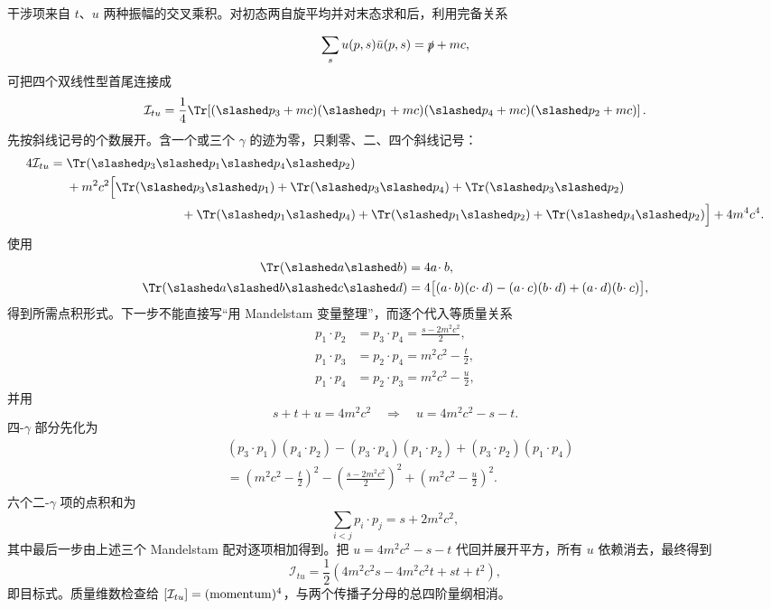 \begin{derivation}[相同费米子交换通道的干涉]
干涉项来自 $t$、$u$ 两种振幅的交叉乘积。对初态两自旋平均并对末态求和后，利用完备关系

\begin{equation*}
\sum_su(p,s)\bar u(p,s)=\slashed p+mc,
\end{equation*}
可把四个双线性型首尾连接成
\begin{equation*}
\mathcal I_{tu}
=\frac14\Tr\!\left[
(\slashed p_3+mc)(\slashed p_1+mc)
(\slashed p_4+mc)(\slashed p_2+mc)
\right].
\end{equation*}
先按斜线记号的个数展开。含一个或三个 $\gamma$ 的迹为零，只剩零、二、四个斜线记号：
\begin{align*}
4\mathcal I_{tu}
={}&\Tr(\slashed p_3\slashed p_1\slashed p_4\slashed p_2)\\
&+m^2c^2\Bigl[
\Tr(\slashed p_3\slashed p_1)
+\Tr(\slashed p_3\slashed p_4)
+\Tr(\slashed p_3\slashed p_2)\\
&\hspace{3.2cm}
+\Tr(\slashed p_1\slashed p_4)
+\Tr(\slashed p_1\slashed p_2)
+\Tr(\slashed p_4\slashed p_2)
\Bigr]
+4m^4c^4.
\end{align*}
使用
\begin{align*}
\Tr(\slashed a\slashed b)&=4a\!\cdot b,\\
\Tr(\slashed a\slashed b\slashed c\slashed d)
&=4\bigl[(a\!\cdot b)(c\!\cdot d)
-(a\!\cdot c)(b\!\cdot d)
+(a\!\cdot d)(b\!\cdot c)\bigr],
\end{align*}
得到所需点积形式。下一步不能直接写“用 Mandelstam 变量整理”，而逐个代入等质量关系
\begin{align*}
p_1\!\cdot p_2&=p_3\!\cdot p_4=\frac{s-2m^2c^2}{2},\\
p_1\!\cdot p_3&=p_2\!\cdot p_4=m^2c^2-\frac t2,\\
p_1\!\cdot p_4&=p_2\!\cdot p_3=m^2c^2-\frac u2,
\end{align*}
并用
\begin{equation*}
s+t+u=4m^2c^2
\quad\Longrightarrow\quad
u=4m^2c^2-s-t.
\end{equation*}
四-$\gamma$ 部分先化为
\begin{align*}
&(p_3\!\cdot p_1)(p_4\!\cdot p_2)
-(p_3\!\cdot p_4)(p_1\!\cdot p_2)
+(p_3\!\cdot p_2)(p_1\!\cdot p_4)\\
&=\left(m^2c^2-\frac t2\right)^2
-\left(\frac{s-2m^2c^2}{2}\right)^2
+\left(m^2c^2-\frac u2\right)^2.
\end{align*}
六个二-$\gamma$ 项的点积和为
\begin{equation*}
\sum_{i<j}p_i\!\cdot p_j
=s+2m^2c^2,
\end{equation*}
其中最后一步由上述三个 Mandelstam 配对逐项相加得到。把 $u=4m^2c^2-s-t$ 代回并展开平方，所有 $u$ 依赖消去，最终得到
\begin{equation*}
\mathcal I_{tu}
=\frac12\left(4m^2c^2s-4m^2c^2t+st+t^2\right),
\end{equation*}
即目标式。质量维数检查给 $[\mathcal I_{tu}]=({\rm momentum})^4$，与两个传播子分母的总四阶量纲相消。
\end{derivation}

